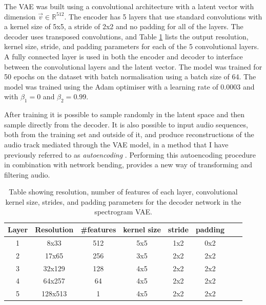 The VAE was built using a convolutional architecture with a latent vector with dimension $\vec{v} \in \mathbb{R}^{512}$. The encoder has 5 layers that use standard convolutions with a kernel size of 5x5, a stride of 2x2 and no padding for all of the layers. The decoder uses transposed convolutions, and Table \ref{tab:c5:decoder-architecture} lists the output resolution, kernel size, stride, and padding parameters for each of the 5 convolutional layers. A fully connected layer is used in both the encoder and decoder to interface between the convolutional layers and the latent vector. The model was trained for 50 epochs on the dataset with batch normalisation using a batch size of 64. The model was trained using the Adam optimiser \citep{kingma2014adam} with a learning rate of 0.0003 and with $\beta_1 = 0$ and $\beta_2 = 0.99$.

After training it is possible to sample randomly in the latent space and then sample directly from the decoder. It is also possible to input audio sequences, both from the training set and outside of it, and produce reconstructions of the audio track mediated through the VAE model, in a method that I have previously referred to as \textit{autoencoding} \citep{broad2017autoencoding}. Performing this autoencoding procedure in combination with network bending, provides a new way of transforming and filtering audio.

\begin{table}[]
    \centering
    \begin{tabular}{|c|c|c|c|c|c|c|c|}
    \hline
    Layer & Resolution & \#features & kernel size & stride & padding \\
    \hline
    1     & 8x33       & 512        & 5x5         & 1x2     & 0x2  \\
    2     & 17x65      & 256        & 3x5         & 2x2     & 2x2 \\
    3     & 32x129     & 128        & 4x5         & 2x2     & 2x2 \\
    4     & 64x257     & 64         & 4x5         & 2x2     & 2x2  \\
    5     & 128x513    & 1          & 4x5         & 2x2     & 2x2  \\
    \hline
    \end{tabular}
    \medskip
    \caption{\label{tab:c5:decoder-architecture}Table showing resolution, number of features of each layer, convolutional kernel size, strides, and padding parameters for the decoder network in the spectrogram VAE.}
    
    \end{table}

